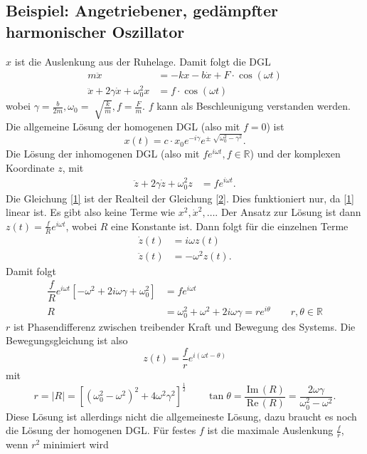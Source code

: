 \documentclass[a4paper,12pt]{article}
\numberwithin{equation}{section}
\begin{document}
\subsection{Beispiel: Angetriebener, gedämpfter harmonischer Oszillator}
$x$ ist die Auslenkung aus der Ruhelage. Damit folgt die DGL
\begin{align*}
        m\ddot{x}&=-kx-b\dot{x}+F\cdot \cos \left(\omega t\right)\\
        \ddot{x}+2\gamma \dot{x}+\omega _0^2x&=f\cdot \cos \left(\omega t\right)\tag{1}\label{1} %
\end{align*}
wobei $\gamma =\tfrac{b}{2m},\omega _0=\sqrt[ ]{\tfrac{k}{m}},f=\tfrac{F}{m}$. $f$ kann als Beschleunigung verstanden werden. Die allgemeine Lösung der homogenen DGL (also mit $f=0$) ist 
\[ 
        x\left(t\right)=c\cdot x_0e^{-i\gamma }e^{\pm\sqrt[]{\omega _0^2-\gamma ^2}}
.\] 
Die Lösung der inhomogenen DGL (also mit $fe^{i\omega t},f \in \mathbb{R}$) und der komplexen Koordinate $z$, mit
\begin{align*}
        \ddot{z}+2\gamma \dot{z}+\omega _0^2z&=fe^{i\omega t}\tag{2}\label{2} %
.\end{align*}
Die Gleichung \eqref{1} ist der Realteil der Gleichung \eqref{2}. Dies funktioniert nur, da \eqref{1} linear ist. Es gibt also keine Terme wie $x^2,\dot{x}^2,\hdots $. Der Ansatz zur Lösung ist dann $z\left(t\right)=\tfrac{f}{R}e^{i\omega t}$, wobei $R$ eine Konstante ist. Dann folgt für die einzelnen Terme
\begin{align*}
        \dot{z}\left(t\right)&=i \omega z\left(t\right)\\
        \ddot{z}\left(t\right)&=-\omega ^2z\left(t\right)
.\end{align*}
Damit folgt
\begin{align*}
        \dfrac{f}{R}e^{i\omega t}\left[-\omega ^2+2i \omega \gamma +\omega _0^2\right]&=fe^{i\omega t}\\
        R&=\omega _0^2+\omega ^2+2i\omega \gamma =re^{i\theta }\qquad r,\theta  \in \mathbb{R}
\end{align*}
$r$ ist Phasendifferenz zwischen treibender Kraft und Bewegung des Systems. Die Bewegungsgleichung ist also
\[ 
        z\left(t\right)=\dfrac{f}{r}e^{i\left(\omega t-\theta \right)}
\] 
mit
\[ 
        r=|R|=\left[\left(\omega _0^2-\omega ^2\right)^2+4\omega ^2\gamma ^2\right]^{\tfrac{1}{2}}\qquad \tan \theta =\dfrac{\,\text{Im}\,\left(R\right)}{\,\text{Re}\,\left(R\right)}=\dfrac{2\omega \gamma }{\omega _0^2-\omega ^2}
.\] 
Diese Lösung ist allerdings nicht die allgemeineste Lösung, dazu braucht es noch die Lösung der homogenen DGL. Für festes $f$ ist die maximale Auslenkung $\tfrac{f}{r}$, wenn $r^2$ minimiert wird
\end{document}
